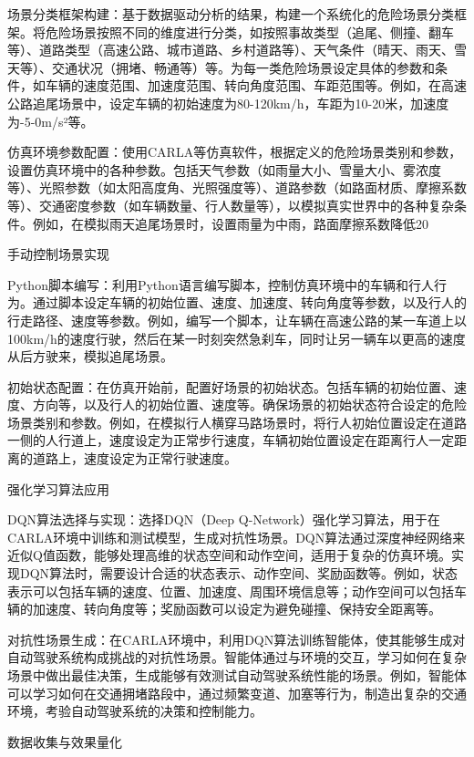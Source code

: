 场景分类框架构建：基于数据驱动分析的结果，构建一个系统化的危险场景分类框架。将危险场景按照不同的维度进行分类，如按照事故类型（追尾、侧撞、翻车等）、道路类型（高速公路、城市道路、乡村道路等）、天气条件（晴天、雨天、雪天等）、交通状况（拥堵、畅通等）等。为每一类危险场景设定具体的参数和条件，如车辆的速度范围、加速度范围、转向角度范围、车距范围等。例如，在高速公路追尾场景中，设定车辆的初始速度为80-120km/h，车距为10-20米，加速度为-5-0m/s²等。

仿真环境参数配置：使用CARLA等仿真软件，根据定义的危险场景类别和参数，设置仿真环境中的各种参数。包括天气参数（如雨量大小、雪量大小、雾浓度等）、光照参数（如太阳高度角、光照强度等）、道路参数（如路面材质、摩擦系数等）、交通密度参数（如车辆数量、行人数量等），以模拟真实世界中的各种复杂条件。例如，在模拟雨天追尾场景时，设置雨量为中雨，路面摩擦系数降低20%

手动控制场景实现

Python脚本编写：利用Python语言编写脚本，控制仿真环境中的车辆和行人行为。通过脚本设定车辆的初始位置、速度、加速度、转向角度等参数，以及行人的行走路径、速度等参数。例如，编写一个脚本，让车辆在高速公路的某一车道上以100km/h的速度行驶，然后在某一时刻突然急刹车，同时让另一辆车以更高的速度从后方驶来，模拟追尾场景。

初始状态配置：在仿真开始前，配置好场景的初始状态。包括车辆的初始位置、速度、方向等，以及行人的初始位置、速度等。确保场景的初始状态符合设定的危险场景类别和参数。例如，在模拟行人横穿马路场景时，将行人初始位置设定在道路一侧的人行道上，速度设定为正常步行速度，车辆初始位置设定在距离行人一定距离的道路上，速度设定为正常行驶速度。

强化学习算法应用

DQN算法选择与实现：选择DQN（Deep Q-Network）强化学习算法，用于在CARLA环境中训练和测试模型，生成对抗性场景。DQN算法通过深度神经网络来近似Q值函数，能够处理高维的状态空间和动作空间，适用于复杂的仿真环境。实现DQN算法时，需要设计合适的状态表示、动作空间、奖励函数等。例如，状态表示可以包括车辆的速度、位置、加速度、周围环境信息等；动作空间可以包括车辆的加速度、转向角度等；奖励函数可以设定为避免碰撞、保持安全距离等。

对抗性场景生成：在CARLA环境中，利用DQN算法训练智能体，使其能够生成对自动驾驶系统构成挑战的对抗性场景。智能体通过与环境的交互，学习如何在复杂场景中做出最佳决策，生成能够有效测试自动驾驶系统性能的场景。例如，智能体可以学习如何在交通拥堵路段中，通过频繁变道、加塞等行为，制造出复杂的交通环境，考验自动驾驶系统的决策和控制能力。

数据收集与效果量化

